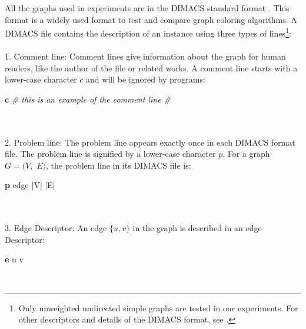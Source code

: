 \documentclass[12pt,a4paper,twoside]{scrartcl}
\numberwithin{equation}{section}
\begin{document}
All the graphs used in experiments are in the DIMACS standard format                     \cite{johnson1996cliques}. This format is a widely used format to test and compare graph coloring algorithms. A DIMACS file contains the description of an instance using three types of lines\footnote{Only unweighted undirected simple graphs are tested in our experiments. For other descriptors and details of the DIMACS format, see \cite{dimacs}.}:\\
\\
1. Comment line: Comment lines give information about the graph for human readers, like the author of the file or related works. A comment line starts with a lower-case character $c$ and will be ignored by programs:\\
\centerline{\textbf{c} \emph{\# this is an example of the comment line \#}}\\
\\
2. Problem line: The problem line appears exactly once in each DIMACS format file. The problem line is signified by a lower-case character $p$. For a graph $G=(V,$ $E)$, the problem line in its DIMACS file is:\\
\centerline{\textbf{p} edge |V| |E|}\\
\\
3. Edge Descriptor: An edge $\{u, v\}$ in the graph is described in an edge Descriptor:\\
\centerline{\textbf{e} u v}\\
\end{document}
